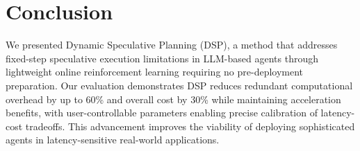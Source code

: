 \section{Conclusion}

We presented Dynamic Speculative Planning (DSP), a method that addresses fixed-step speculative execution limitations in LLM-based agents through lightweight online reinforcement learning requiring no pre-deployment preparation. Our evaluation demonstrates DSP reduces redundant computational overhead by up to 60\% and overall cost by 30\% while maintaining acceleration benefits, with user-controllable parameters enabling precise calibration of latency-cost tradeoffs. 
This advancement improves the viability of deploying sophisticated agents in latency-sensitive real-world applications.

